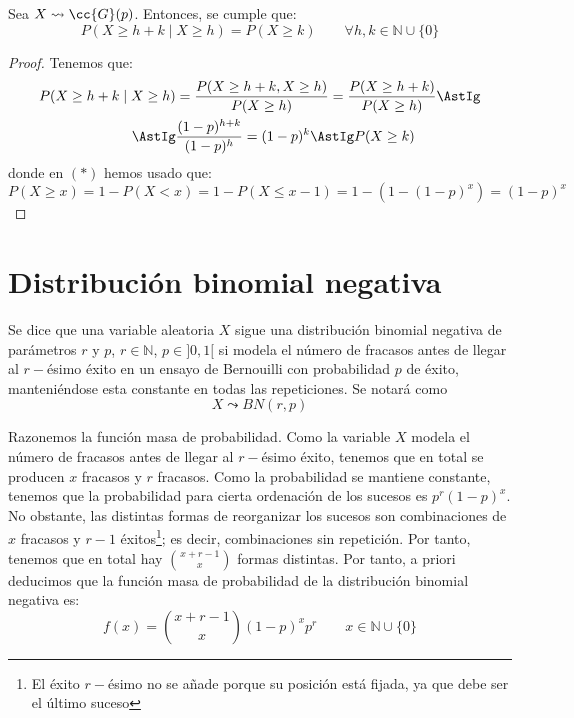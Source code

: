 \begin{prop}
    Sea $X\leadsto \cc{G}(p)$. Entonces, se cumple que:
    \begin{equation*}
        P(X\geq h + k \mid X\geq h) = P(X\geq k) \qquad \forall h,k \in \mathbb{N}\cup \{0\}
    \end{equation*}
    \begin{proof}
        Tenemos que:
        \begin{align*}
            P(X\geq h + k \mid X\geq h) &= \frac{P(X\geq h+k, X\geq h)}{P(X\geq h)} = \frac{P(X\geq h+k)}{P(X\geq h)} \AstIg\\
            \AstIg & \dfrac{(1-p)^{h+k}}{(1-p)^h} = (1-p)^k \AstIg P(X\geq k)
        \end{align*}
        donde en $(\ast)$ hemos usado que:
        \begin{equation*}
            P(X\geq x) = 1-P(X<x) = 1-P(X\leq x-1) = 1-(1-(1-p)^x) = (1-p)^x
        \end{equation*}
    \end{proof}
\end{prop}






\section{Distribución binomial negativa}
\begin{definicion}
    Se dice que una variable aleatoria $X$ sigue una distribución binomial negativa de parámetros $r$ y $p$, $r\in \mathbb{N}$, $p\in ]0,1[$ si modela el número de fracasos antes de llegar al $r-$ésimo éxito en un ensayo de Bernouilli con probabilidad $p$ de éxito, manteniéndose esta constante en todas las repeticiones. Se notará como $$X\leadsto BN(r,p)$$
\end{definicion}

Razonemos la función masa de probabilidad. Como la variable $X$ modela el número de fracasos antes de llegar al $r-$ésimo éxito, tenemos que en total se producen $x$ fracasos y $r$ fracasos. Como la probabilidad se mantiene constante, tenemos que la probabilidad para cierta ordenación de los sucesos es $p^r(1-p)^{x}$. No obstante, las distintas formas de reorganizar los sucesos son combinaciones de $x$ fracasos y $r-1$ éxitos\footnote{El éxito $r-$ésimo no se añade porque su posición está fijada, ya que debe ser el último suceso}; es decir, combinaciones sin repetición. Por tanto, tenemos que en total hay $\binom{x+r-1}{x}$ formas distintas. Por tanto, a priori deducimos que la función masa de probabilidad de la distribución binomial negativa es:
\begin{equation*}
    f(x) = \binom{x+r-1}{x}(1-p)^{x}p^r \qquad x\in \mathbb{N}\cup \{0\}
\end{equation*}


